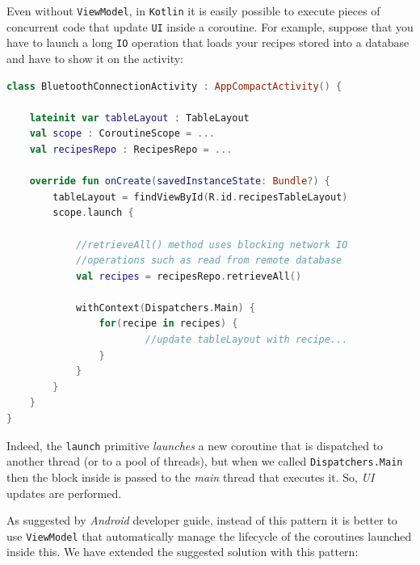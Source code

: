Even without \texttt{ViewModel}, in \texttt{Kotlin} it is easily possible to execute pieces of concurrent code that update \texttt{UI} inside a coroutine. For example, suppose that you have to launch a long \texttt{IO} operation that loads your recipes stored into a database and have to show it on the activity:

\begin{lstlisting}[language=Kotlin]
class BluetoothConnectionActivity : AppCompactActivity() {
	
	lateinit var tableLayout : TableLayout
	val scope : CoroutineScope = ...
	val recipesRepo : RecipesRepo = ...
	
	override fun onCreate(savedInstanceState: Bundle?) {
		tableLayout = findViewById(R.id.recipesTableLayout)
		scope.launch {
			
			//retrieveAll() method uses blocking network IO
			//operations such as read from remote database
			val recipes = recipesRepo.retrieveAll()
			
			withContext(Dispatchers.Main) {
				for(recipe in recipes) {
						//update tableLayout with recipe...
				}
			}
		}
	}
}
\end{lstlisting}

Indeed, the \texttt{launch} primitive \textit{launches} a new coroutine that is dispatched to another thread (or to a pool of threads), but when we called \texttt{Dispatchers.Main} then the block inside is passed to the \textit{main} thread that executes it. So, \textit{UI} updates are performed.

As suggested by \textit{Android} developer guide, instead of this pattern it is better to use \texttt{ViewModel} that automatically manage the lifecycle of the coroutines launched inside this.
We have extended the suggested solution with this pattern:

